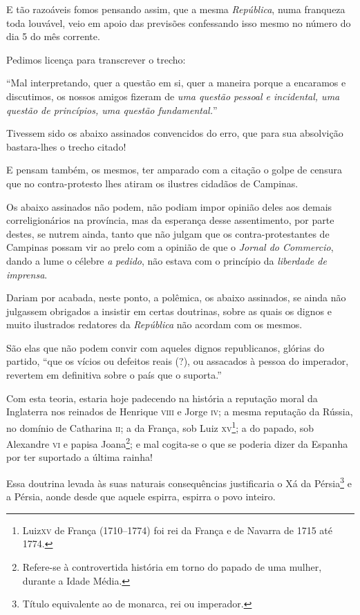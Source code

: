 E tão razoáveis fomos pensando assim, que a mesma \emph{República}, numa
franqueza toda louvável, veio em apoio das previsões confessando isso
mesmo no número do dia 5 do mês corrente.

Pedimos licença para transcrever o trecho:

``Mal interpretando, quer a questão em si, quer a maneira porque a
encaramos e discutimos, os nossos amigos fizeram de \emph{uma questão
pessoal e incidental, uma questão de princípios, uma questão
fundamental.}''

Tivessem sido os abaixo assinados convencidos do erro, que para sua
absolvição bastara-lhes o trecho citado!

E pensam também, os mesmos, ter amparado com a citação o golpe de
censura que no contra-protesto lhes atiram os ilustres cidadãos de
Campinas.

Os abaixo assinados não podem, não podiam impor opinião deles aos demais
correligionários na província, mas da esperança desse assentimento, por
parte destes, se nutrem ainda, tanto que não julgam que os
contra-protestantes de Campinas possam vir ao prelo com a opinião de que
o \emph{Jornal do Commercio}, dando a lume o célebre \emph{a}
\emph{pedido}, não estava com o princípio da \emph{liberdade de
imprensa}.

Dariam por acabada, neste ponto, a polêmica, os abaixo assinados, se
ainda não julgassem obrigados a insistir em certas doutrinas, sobre as
quais os dignos e muito ilustrados redatores da \emph{República} não
acordam com os mesmos.

São elas que não podem convir com aqueles dignos republicanos, glórias
do partido, ``que os vícios ou defeitos reais (?), ou assacados à pessoa
do imperador, revertem em definitiva sobre o país que o suporta.''

Com esta teoria, estaria hoje padecendo na história a reputação moral da
Inglaterra nos reinados de Henrique \textsc{viii} e Jorge \textsc{iv}; a mesma reputação
da Rússia, no domínio de Catharina \textsc{ii}; a da França, sob Luiz
\textsc{xv}\footnote{ Luiz\textsc{xv} de França (1710--1774) foi rei da França e de
  Navarra de 1715 até 1774.}; a do papado, sob Alexandre \textsc{vi} e papisa
Joana\footnote{ Refere-se à controvertida história em torno do papado
  de uma mulher, durante a Idade Média.}; e mal cogita-se o que se
poderia dizer da Espanha por ter suportado a última rainha!

Essa doutrina levada às suas naturais consequências justificaria o Xá da
Pérsia\footnote{ Título equivalente ao de monarca, rei ou imperador.} e
a Pérsia, aonde desde que aquele espirra, espirra o povo inteiro.


